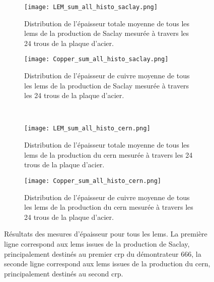                 \begin{figure}[htpb]
                    \begin{subfigure}[t]{0.48\textwidth}
                        \texttt{[image: LEM\_sum\_all\_histo\_saclay.png]}
                        \caption{Distribution de l'épaisseur totale moyenne de tous les \glspl{lem} de la production de Saclay mesurée à travers les 24 trous de la plaque d'acier.}
                        \label{fig::distri_lem_saclay}
                    \end{subfigure}
                    \hfill
                    \begin{subfigure}[t]{0.48\textwidth}
                        \texttt{[image: Copper\_sum\_all\_histo\_saclay.png]}
                        \caption{Distribution de l'épaisseur de cuivre moyenne de tous les \glspl{lem} de la production de Saclay mesurée à travers les 24 trous de la plaque d'acier.}
                        \label{fig::distri_cuivre_saclay}
                    \end{subfigure}\\
                    \begin{subfigure}[b]{0.48\textwidth}
                        \texttt{[image: LEM\_sum\_all\_histo\_cern.png]}
                        \caption{Distribution de l'épaisseur totale moyenne de tous les \glspl{lem} de la production du \gls{cern} mesurée à travers les 24 trous de la plaque d'acier.}
                        \label{fig::distri_lem_cern}
                    \end{subfigure}
                    \hfill
                    \begin{subfigure}[b]{0.48\textwidth}
                        \texttt{[image: Copper\_sum\_all\_histo\_cern.png]}
                        \caption{Distribution de l'épaisseur de cuivre moyenne de tous les \glspl{lem} de la production du \gls{cern} mesurée à travers les 24 trous de la plaque d'acier.}
                        \label{fig::distri_cuivre_cern}
                    \end{subfigure}
                    \caption[Résultats des mesures d'épaisseur pour tous les \glspl{lem}.]{Résultats des mesures d'épaisseur pour tous les \glspl{lem}. La première ligne correspond aux \glspl{lem} issues de la production de Saclay, principalement destinés au premier \gls{crp} du démontrateur 666, la seconde ligne correspond aux \glspl{lem} issues de la production du \gls{cern}, principalement destinés au second \gls{crp}.}
                    \label{fig::epaisseur_tous_lem}
                \end{figure}
                
